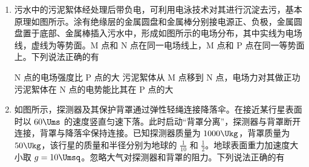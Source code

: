 \documentclass[\gkver]{gaokaozhenti}
\begin{document}
\begin{enumerate}
{$F = ky - mg$

木块所受合外力向上，木块做加速度增大的减速运动，所以 $y - t$ 图斜率减小，到达最低点后，木块向上运动，经以上分析可知，木块先做加速度减小的加速运动，再做加速度增大的减速运动，再做匀减速直线运动到最高点，$y - t$ 图像大致为右图。


故 CD 错误。

故选 B。
}

\item
污水中的污泥絮体经处理后带负电，可利用电泳技术对其进行沉淀去污，基本原理如图所示。涂有绝缘层的金属圆盘和金属棒分别接电源正、负极，金属圆盘置于底部、金属棒插入污水中，形成如图所示的电场分布，其中实线为电场线，虚线为等势面。M 点和 N 点在同一电场线上，M 点和 P 点在同一等势面上。下列说法正确的有


{N 点的电场强度比 P 点的大}
{污泥絮体从 M 点移到 N 点，电场力对其做正功}
{污泥絮体在 N 点的电势能比其在 P 点的大}


\item
如图所示，探测器及其保护背罩通过弹性轻绳连接降落伞。在接近某行星表面时以 $60 \Ums$ 的速度竖直匀速下落。此时启动“背罩分离”，探测器与背罩断开连接，背罩与降落伞保持连接。已知探测器质量为 $1000 \Ukg$，背罩质量为 $50 \Ukg$，该行星的质量和半径分别为地球的 $\frac{1}{10}$ 和 $\frac{1}{2}$。地球表面重力加速度大小取 $g = 10 \Umsq$。忽略大气对探测器和背罩的阻力。下列说法正确的有


\end{enumerate}
\end{document}
